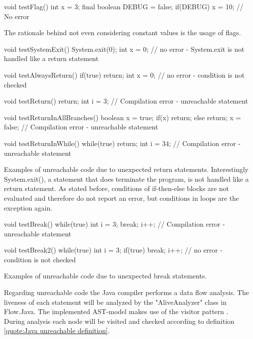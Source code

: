 \begin{program}
	\begin{JavaCode}
void testFlag() {
	int x = 3;
	final boolean DEBUG = false;
	if(DEBUG) x = 10; // No error
}\end{JavaCode}
	\caption{The rationale behind not even considering constant values is the usage of flags.}
	\label{code:Java flags}
\end{program}

\begin{program}
	\begin{JavaCode}
void testSystemExit() {
	System.exit(0);
	int x = 0; // no error - System.exit is not handled like a return statement
}

void testAlwaysReturn() {
	if(true) return;
	int x = 0; // no error - condition is not checked
}

void testReturn() {
	return;
	int i = 3; // Compilation error - unreachable statement
}

void testReturnInAllBranches() {
	boolean x = true;
	if(x) return;
	else return;
	x = false; // Compilation error - unreachable statement
}

void testReturnInWhile() {
	while(true) {
		return;
	}
	int i = 34; // Compilation error - unreachable statement
}\end{JavaCode}
	\caption{Examples of unreachable code due to unexpected return statements. Interestingly System.exit(), a statement that does terminate the program, is not handled like a return statement. As stated before, conditions of if-then-else blocks are not evaluated and therefore do not report an error, but conditions in loops are the exception again. }
	\label{code:Java unexpected return}
\end{program}

\begin{program}
	\begin{JavaCode}
void testBreak() {
	while(true) {
		int i = 3;
		break; 
		i++; // Compilation error - unreachable statement
	}
}

void testBreak2() {
	while(true) {
		int i = 3;
		if(true) break; 
		i++; // no error - condition is not checked
	}
}\end{JavaCode}
	\caption{Examples of unreachable code due to unexpected break statements.}
	\label{code:Java unexpected break}
\end{program}

Regarding unreachable code the Java compiler performs a data flow analysis. The liveness of each statement will be analyzed by the "AliveAnalyzer" class in Flow.Java. The implemented AST-model makes use of the visitor pattern \cite{gammaDesignPatternsElements}. During analysis each node will be visited and checked according to definition \ref{quote:Java unreachable definition}.



